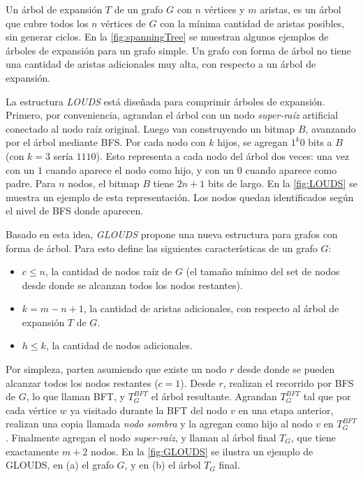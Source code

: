 



Un árbol de expansión $T$ de un grafo $G$  con $n$ vértices y $m$ aristas, es un árbol que cubre todos los $n$ vértices de $G$ con la mínima cantidad de aristas posibles, sin generar ciclos. En la \autoref{fig:spanningTree} se muestran algunos ejemplos de árboles de expansión para un grafo simple. Un grafo con forma de árbol no tiene una cantidad de aristas adicionales muy alta, con respecto a un árbol de expansión.

La estructura \textit{LOUDS} \cite{jacobson1989space} está diseñada para comprimir árboles de expansión. Primero, por conveniencia, agrandan el árbol con un nodo \textit{super-raíz} artificial conectado al nodo raíz original. Luego van construyendo un bitmap $B$, avanzando por el árbol mediante BFS. Por cada nodo con $k$ hijos, se agregan $1^{k}0$ bits a $B$ (con $k=3$ sería $1110$). Esto representa a cada nodo del árbol dos veces: una vez con un $1$ cuando aparece el nodo como hijo, y con un $0$ cuando aparece como padre. Para $n$ nodos, el bitmap $B$ tiene $2n + 1$ bits de largo. En la \autoref{fig:LOUDS} se muestra un ejemplo de esta representación. Los nodos quedan identificados según el nivel de BFS donde aparecen.

Basado en esta idea, \textit{GLOUDS} \cite{fischer2016glouds} propone una nueva estructura para grafos con forma de árbol. Para esto define las siguientes características de un grafo $G$:

\begin{itemize}
	\item $c \leq n$, la cantidad de nodos raíz de $G$ (el tamaño mínimo del set de nodos desde donde se alcanzan todos los nodos restantes). 
	\item $k = m - n + 1$, la cantidad de aristas adicionales, con respecto al árbol de expansión $T$ de $G$.
	\item $h \leq k$, la cantidad de nodos adicionales.
\end{itemize}

Por simpleza, parten asumiendo que existe un nodo $r$ desde donde se pueden alcanzar todos los nodos restantes ($c = 1$). Desde $r$, realizan el recorrido por BFS de $G$, lo que llaman BFT, y $T_{G}^{BFT}$ el árbol resultante. Agrandan $T_{G}^{BFT}$ tal que por cada vértice $w$ ya visitado durante la BFT del nodo $v$ en una etapa anterior, realizan una copia llamada \textit{nodo sombra} y la agregan como hijo al nodo $v$ en $T_{G}^{BFT}$. Finalmente agregan el nodo \textit{super-raíz}, y llaman al árbol final $T_{G}$, que tiene exactamente $m + 2$ nodos. En la \autoref{fig:GLOUDS} se ilustra un ejemplo de GLOUDS, en (a) el grafo $G$, y en (b) el árbol $T_{G}$ final.

